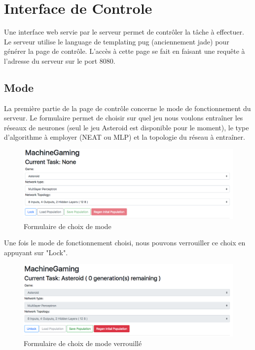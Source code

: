 \documentclass{article}
\begin{document}
\newpage
\section{Interface de Controle}

Une interface web servie par le serveur permet de contrôler la tâche à effectuer. Le serveur utilise le language de templating pug (anciennement jade) pour générer la page de contrôle. L'accès à cette page se fait en faisant une requête à l'adresse du serveur sur le port 8080.\\

\subsection{Mode}

La première partie de la page de contrôle concerne le mode de fonctionnement du serveur. Le formulaire permet de choisir sur quel jeu  nous voulons entraîner les réseaux de neurones (seul le jeu Asteroid est disponible pour le moment), le type d'algorithme à employer (NEAT ou MLP) et la topologie du réseau à entraîner.

\begin{figure}[H]
\begin{center}
	\includegraphics[scale=0.4]{unlockedmode.png} 
	\caption{Formulaire de choix de mode}
\end{center}
\end{figure}

Une fois le mode de fonctionnement choisi, nous pouvons verrouiller ce choix en appuyant sur "Lock". 

\begin{figure}[H]
\begin{center}
	\includegraphics[scale=0.4]{lockedmode.png} 
	\caption{Formulaire de choix de mode verrouillé}
\end{center}
\end{figure}
\end{document}
